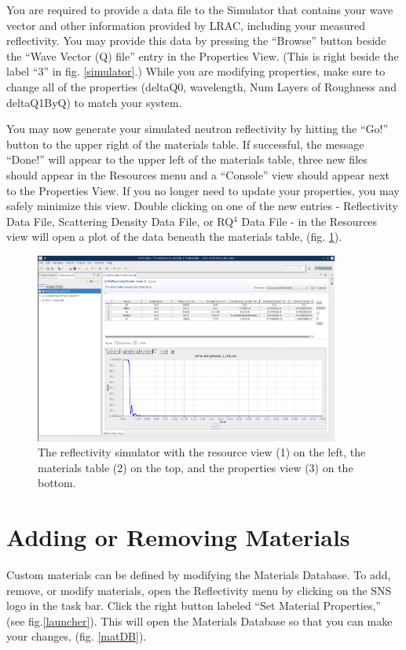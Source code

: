 You are required to provide a data file to the Simulator that contains your wave
vector and other information provided by LRAC, including your measured
reflectivity. You may provide this data by pressing the ``Browse'' button beside
the ``Wave Vector (Q) file'' entry in the Properties View. (This is right beside
the label ``3'' in fig. \ref{simulator}.) While you are modifying properties,
make sure to change all of the properties (deltaQ0, wavelength, Num Layers of
Roughness and deltaQ1ByQ) to match your system.

You may now generate your simulated neutron reflectivity by hitting the ``Go!''
button to the upper right of the materials table. If successful, the message
``Done!'' will appear to the upper left of the materials table, three new files
should appear in the Resources menu and a ``Console'' view should appear next to
the Properties View. If you no longer need to update your properties, you may
safely minimize this view. Double clicking on one of the new entries -
Reflectivity Data File, Scattering Density Data File, or RQ$^4$ Data File - in
the Resources view will open a plot of the data beneath the materials table, (fig.
\ref{simulatorPost}).

\begin{figure}[!h]
\centering
\includegraphics[width=10cm]{images/simulatorProcessed.png}
\caption{The reflectivity simulator with the resource view (1) on the left, the
materials table (2) on the top, and the properties view (3) on the bottom.}
\label{simulatorPost}
\end{figure}

\section{Adding or Removing Materials}
\label{modifyMaterials}

Custom materials can be defined by modifying the Materials Database. To add,
remove, or modify materials, open the Reflectivity menu by clicking on the SNS
logo in the task bar. Click the right button labeled ``Set Material
Properties,'' (see fig.\ref{launcher}). This will open the Materials Database so
that you can make your changes, (fig. \ref{matDB}).

